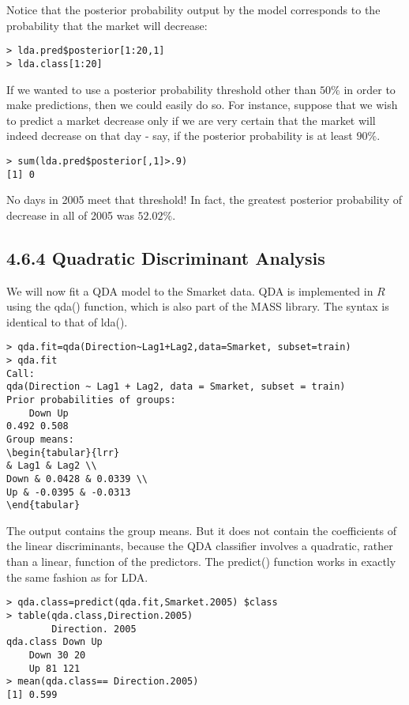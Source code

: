 \documentclass[10pt]{article}
\begin{document}
Notice that the posterior probability output by the model corresponds to the probability that the market will decrease:

\begin{verbatim}
> lda.pred$posterior[1:20,1]
> lda.class[1:20]
\end{verbatim}

If we wanted to use a posterior probability threshold other than $50 \%$ in order to make predictions, then we could easily do so. For instance, suppose that we wish to predict a market decrease only if we are very certain that the market will indeed decrease on that day - say, if the posterior probability is at least $90 \%$.

\begin{verbatim}
> sum(lda.pred$posterior[,1]>.9)
[1] 0
\end{verbatim}

No days in 2005 meet that threshold! In fact, the greatest posterior probability of decrease in all of 2005 was $52.02 \%$.

\subsection*{4.6.4 Quadratic Discriminant Analysis}
We will now fit a QDA model to the Smarket data. QDA is implemented in $R$ using the qda() function, which is also part of the MASS library. The syntax is identical to that of lda().


\begin{verbatim}
> qda.fit=qda(Direction~Lag1+Lag2,data=Smarket, subset=train)
> qda.fit
Call:
qda(Direction ~ Lag1 + Lag2, data = Smarket, subset = train)
Prior probabilities of groups:
    Down Up
0.492 0.508
Group means:
\begin{tabular}{lrr} 
& Lag1 & Lag2 \\
Down & 0.0428 & 0.0339 \\
Up & -0.0395 & -0.0313
\end{tabular}
\end{verbatim}

The output contains the group means. But it does not contain the coefficients of the linear discriminants, because the QDA classifier involves a quadratic, rather than a linear, function of the predictors. The predict() function works in exactly the same fashion as for LDA.

\begin{verbatim}
> qda.class=predict(qda.fit,Smarket.2005) $class
> table(qda.class,Direction.2005)
        Direction. 2005
qda.class Down Up
    Down 30 20
    Up 81 121
> mean(qda.class== Direction.2005)
[1] 0.599
\end{verbatim}
\end{document}
